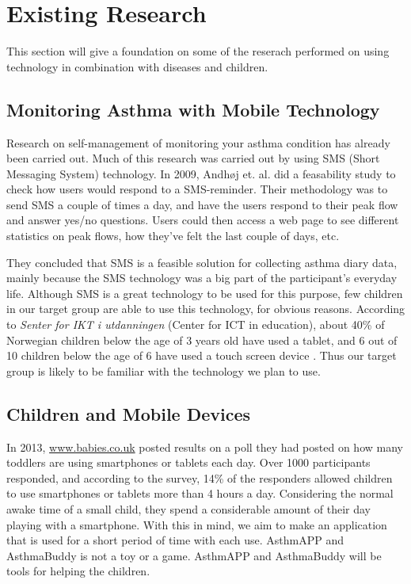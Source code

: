 \section{Existing Research}
\label{sec:existing-research}

This section will give a foundation on some of the reserach performed on using technology in combination with diseases and children. 


\subsection{Monitoring Asthma with Mobile Technology}
Research on self-management of monitoring your asthma condition has already been carried out. Much of this research was carried out by using SMS (Short Messaging System) technology. In 2009, Andh\o j  et. al.\cite{anhoj2004feasibility} did a feasability study to check how users would respond to a SMS-reminder. Their methodology was to send SMS a couple of times a day, and have the users respond to their peak flow and answer yes/no questions. Users could then access a web page to see different statistics on peak flows, how they've felt the last couple of days, etc.

They concluded that SMS is a feasible solution for collecting asthma diary data, mainly because the SMS technology was a big part of the participant's everyday life. Although SMS is a great technology to be used for this purpose, few children in our target group are able to use this technology, for obvious reasons. According to \emph{Senter for IKT i utdanningen} (Center for ICT in education), about 40\% of Norwegian children below the age of 3 years old have used a tablet, and 6 out of 10 children below the age of 6 have used a touch screen device \cite{nrkchilduse}. Thus our target group is likely to be familiar with the technology we plan to use.  


\subsection{Children and Mobile Devices}
In 2013, \url{www.babies.co.uk} posted results on a poll they had posted on how many toddlers are using smartphones or tablets each day\cite{babiesusageoftablets}. Over 1000 participants responded,  and according to the survey, 14\% of the responders allowed children to use smartphones or tablets more than 4 hours a day. Considering the normal awake time of a small child, they spend a considerable amount of their day playing with a smartphone. With this in mind, we aim to make an application that is used for a short period of time with each use. AsthmAPP and AsthmaBuddy is not a toy or a game. AsthmAPP and AsthmaBuddy will be tools for helping the children.


